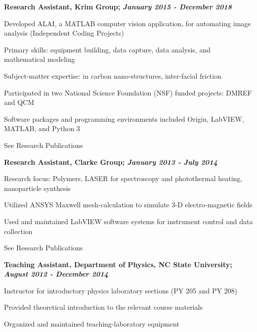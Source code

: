 \documentclass[letterpaper,final]{memoir}
\newcommand{\Sep}{\vspace{1.0em}}
\newcommand{\SmallSep}{\vspace{0.4em}}
\newcommand{\CVItem}[1]
	{\textbf{\color{Blue} #1}}
\begin{document}
\CVItem{Research Assistant, Krim Group; \textit{January 2015 - December 2018}}
\begin{compactitem}[\color{Blue}$\circ$]
   
    \SmallSep

    \item Developed ALAI, a MATLAB computer vision application, for automating image analysis (Independent Coding Projects)
    \item Primary skills: equipment building, data capture, data analysis, and mathematical modeling
    \item Subject-matter expertise: in carbon nano-structures, inter-facial friction
    \item Participated in two National Science Foundation (NSF) funded projects: DMREF and QCM
    \item Software packages and programming environments included Origin, LabVIEW, MATLAB, and Python 3
    \item See Research Publications

\end{compactitem}
\Sep

\CVItem{Research Assistant, Clarke Group; \textit{January 2013 - July 2014}}
\begin{compactitem}[\color{Blue}$\circ$]
    
    \SmallSep

    \item Research focus: Polymers, LASER for spectroscopy and photothermal heating, nanoparticle synthesis
    \item Utilized ANSYS Maxwell mesh-calculation to simulate 3-D electro-magnetic fields
    \item Used and maintained LabVIEW software systems for instrument control and data collection
    \item See Research Publications

\end{compactitem}

\Sep

\CVItem{Teaching Assistant, Department of Physics, NC State University; \textit{August 2012 - December 2014}}
\begin{compactitem}[\color{Blue}$\circ$]

    \SmallSep
	
    \item Instructor for introductory physics laboratory sections (PY 205 and PY 208)
    \item Provided theoretical introduction to the relevant course materials
    \item Organized and maintained teaching-laboratory equipment
    
\end{compactitem}
\end{document}
